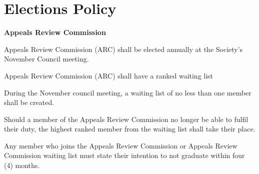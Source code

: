 \section{Elections Policy}
\begin{longenum}[ label*=\thesection.\arabic*., align=left]
 \item \textbf{Appeals Review Commission}
 \begin{longenum}[label*=\arabic*., align=left]
  \item Appeals Review Commission (ARC) shall be elected annually at the Society's November Council meeting.
  \item Appeals Review Commission (ARC) shall have a ranked waiting list
  \begin{longenum}[label*=\arabic*., align=left]
  	\item  During the November council meeting, a waiting list of no less than one member shall be created.
  	\item Should a member of the Appeals Review Commission no longer be able to fulfil their duty, the highest ranked member from the waiting list shall take their place.
  \end{longenum}
  \item Any member who joins the Appeals Review Commission or Appeals Review Commission waiting list must state their intention to not graduate within four (4) months.
 

\end{longenum}
\end{longenum}
